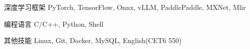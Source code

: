 

\begin{cvskills}

  \cvskill
    {深度学习框架} %
    {PyTorch, TensorFlow, Onnx, vLLM, PaddlePaddle, MXNet, Mlir} %

  \cvskill
    {编程语言} %
    {C/C++, Python, Shell} %

  \cvskill
    {其他技能} %
    {Linux, Git, Docker, MySQL, English(CET6 550)} %

\end{cvskills}
